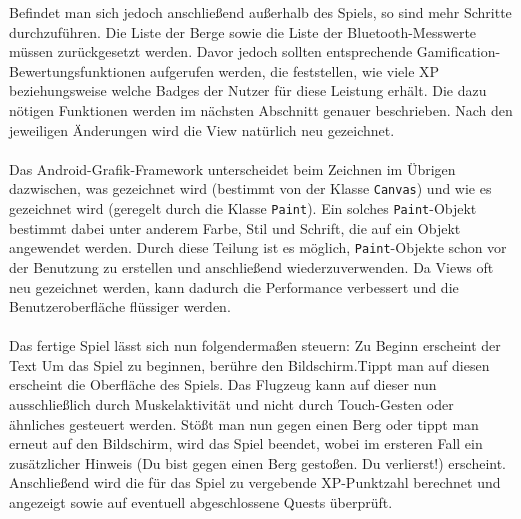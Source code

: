 Befindet man sich jedoch anschließend außerhalb des Spiels, so sind mehr Schritte durchzuführen. Die Liste der Berge sowie die Liste der Bluetooth-Messwerte müssen zurückgesetzt werden. Davor jedoch sollten entsprechende Gamification-Bewertungsfunktionen aufgerufen werden, die feststellen, wie viele XP beziehungsweise welche Badges der Nutzer für diese Leistung erhält. Die dazu nötigen Funktionen werden im nächsten Abschnitt genauer beschrieben. Nach den jeweiligen Änderungen wird die View natürlich neu gezeichnet. \\ \\
Das Android-Grafik-Framework unterscheidet beim Zeichnen im Übrigen dazwischen, was gezeichnet wird (bestimmt von der Klasse \texttt{Canvas}) und wie es gezeichnet wird (geregelt durch die Klasse \texttt{Paint}).\cite{Src:CustomView} Ein solches \texttt{Paint}-Objekt bestimmt dabei unter anderem Farbe, Stil und Schrift, die auf ein Objekt angewendet werden. Durch diese Teilung ist es möglich, \texttt{Paint}-Objekte schon vor der Benutzung zu erstellen und anschließend wiederzuverwenden. Da Views oft neu gezeichnet werden, kann dadurch die Performance verbessert und die Benutzeroberfläche flüssiger werden.\cite{Src:CustomView} \\ \\
Das fertige Spiel lässt sich nun folgendermaßen steuern: Zu Beginn erscheint der Text \glqq Um das Spiel zu beginnen, berühre den Bildschirm.\grqq Tippt man auf diesen erscheint die Oberfläche des Spiels. Das Flugzeug kann auf dieser nun ausschließlich durch Muskelaktivität und nicht durch Touch-Gesten oder ähnliches gesteuert werden. Stößt man nun gegen einen Berg oder tippt man erneut auf den Bildschirm, wird das Spiel beendet, wobei im ersteren Fall ein zusätzlicher Hinweis (\glqq Du bist gegen einen Berg gestoßen. Du verlierst!\grqq) erscheint. Anschließend wird die für das Spiel zu vergebende XP-Punktzahl berechnet und angezeigt sowie auf eventuell abgeschlossene Quests überprüft.
